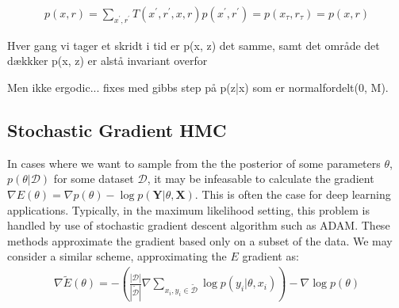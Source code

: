 \begin{align*}
    p(x, r) = \sum_{x^\prime, r^\prime} T(x^\prime, r^\prime, x, r) p(x^\prime, r^\prime) = p(x_\tau, r_\tau) =  p(x, r)
\end{align*}


Hver gang vi tager et skridt i tid er p(x, z) det samme, samt det område det dækkker   p(x, z) er alstå invariant overfor 

Men ikke ergodic... fixes med gibbs step på p(z|x) som er normalfordelt(0, M).


    
\subsection{Stochastic Gradient HMC}

In cases where we want to sample from the the posterior of some parameters $\theta$,  $p(\theta | \mathcal{D})$ for some dataset $\mathcal{D}$, it may be infeasable to calculate the gradient $\nabla E(\theta) = \nabla p(\theta) - \log{p(\bm{Y} | \theta, \bm{X})}$. 
This is often the case for deep learning applications.
Typically, in the maximum likelihood setting, this problem is handled by use of stochastic gradient descent algorithm such as ADAM. 
These methods approximate the gradient based only on a subset of the data. 
We may consider a similar scheme, approximating the $E$ gradient as:
\begin{align*}
    \nabla\tilde{E}(\theta) = -\left(\frac{|\mathcal{D}|}{|\tilde{\mathcal{D}}|}  \nabla \sum_{x_i, y_i\in \tilde{\mathcal{D}}} \log{p(y_i |\theta, x_i)}\right)  -\nabla \log{p(\theta)}
\end{align*}

